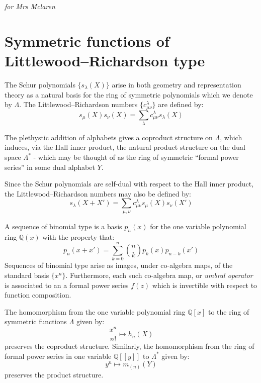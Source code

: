 \documentclass[12pt,dvips]{amsart}
\begin{document}
\newpage

\hfill \break

\hfill \break

\hfill \break

\hfill \break

\begin{center}
{\it for Mrs Mclaren}
\end{center}


\newpage

\setcounter{tocdepth}{3}{\small\tableofcontents}

\section{Symmetric functions of Littlewood--Richardson type}

The Schur polynomials $\{s_\lambda(X)\}$ arise in both geometry and representation theory as a natural basis for the ring of symmetric polynomials which we denote by $\Lambda$. The Littlewood--Richardson numbers $\{c^{\lambda}_{\mu \nu}\}$ are defined by:
$$ s_\mu(X)s_\nu(X) = \sum_\lambda c^{\lambda}_{\mu \nu} s_\lambda(X) $$

The plethystic addition of alphabets gives a coproduct structure on $\Lambda$, which induces, via the Hall inner product, the natural product structure on the dual space $\Lambda^*$ - which may be thought of as the ring of symmetric ``formal power series'' in some dual alphabet $Y$.

Since the Schur polynomials are self-dual with respect to the Hall inner product, the Littlewood--Richardson numbers may also be defined by:
$$ s_\lambda(X + X') = \sum_{\mu, \nu} c^{\lambda}_{\mu \nu} s_\mu(X) s_\nu(X') $$

A sequence of binomial type is a basis $p_n(x)$ for the one variable polynomial ring $\mathbb{Q}(x)$ with the property that:
$$ p_n(x+x') = \sum_{k=0}^n \binom{n}{k} p_k(x) p_{n-k}(x') $$
Sequences of binomial type arise as images, under co-algebra maps, of the standard basis $\{x^n\}$. Furthermore, each such co-algebra map, or {\it umbral operator} is associated to an a formal power series $f(z)$ which is invertible with respect to function composition.

The homomorphism from the one variable polynomial ring $\mathbb{Q}[x]$ to the ring of symmetric functions $\Lambda$ given by:
$$ \frac{x^n}{n!} \mapsto h_n(X) $$
preserves the coproduct structure. Similarly, the homomorphism from the ring of formal power series in one variable $\mathbb{Q}[[y]]$ to $\Lambda^*$ given by:
$$ y^n \mapsto m_{(n)}(Y) $$
preserves the product structure. 
\end{document}
